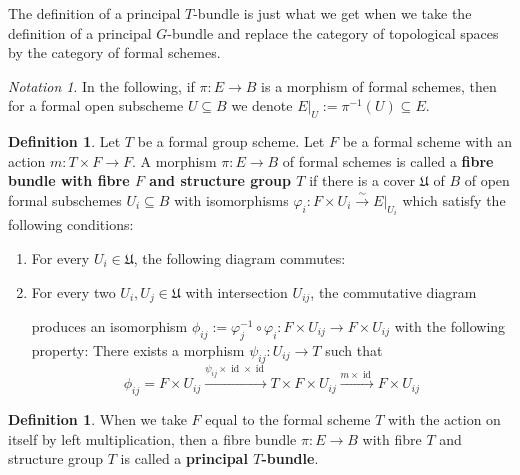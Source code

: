 \documentclass[11pt,oneside]{amsart}
\theoremstyle{definition}
\newtheorem{definition}[theorem]{Definition}
\theoremstyle{remark}
\newtheorem*{notation}{Notation}
\begin{document}
	
	The definition of a principal $T$-bundle is just what we get when we take the definition of a principal $G$-bundle and replace the category of topological spaces by the category of formal schemes.
	\begin{notation}
		In the following, if $\pi:E\rightarrow B$ is a morphism of formal schemes, then for a formal open subscheme $U\subseteq B$ we denote $E|_U:=\pi^{-1}(U)\subseteq E$.
	\end{notation}
	\begin{definition}\label{definition principal T-bundle}
		Let $T$ be a formal group scheme. Let $F$ be a formal scheme with an action $m:T\times F\rightarrow F$.
		A morphism $\pi:E\rightarrow B$ of formal schemes is called a \textbf{fibre bundle with fibre $F$ and structure group $T$} if there is a cover $\mathfrak U$ of $B$ of open formal subschemes $U_i\subseteq B$ with isomorphisms $\varphi_i:F\times U_i \xrightarrow{\sim} E|_{U_i}$ which satisfy the following conditions:
		\begin{enumerate}[label=(\alph*)]
			\item For every $U_i\in \mathfrak U$, the following diagram commutes:
			\begin{center}
			\end{center}
			\item For every two $U_i,U_j\in \mathfrak U$ with intersection $U_{ij}$, the commutative diagram
			\begin{center}
			\end{center}
			produces an isomorphism $\phi_{ij}:=\varphi_j^{-1}\circ\varphi_i: F\times U_{ij}\rightarrow F\times U_{ij}$ with the following property: There exists a morphism $\psi_{ij}:U_{ij}\rightarrow T$ such that
			\[\phi_{ij}=F\times U_{ij} \xrightarrow{\psi_{ij}\times \operatorname{id}\times\operatorname{id}} T\times F\times U_{ij}\xrightarrow{m\times \operatorname{id}} F\times U_{ij}\]
		\end{enumerate}
	\end{definition}
	\begin{definition}
		When we take $F$ equal to the formal scheme $T$ with the action on itself by left multiplication, then a fibre bundle $\pi:E\rightarrow B$ with fibre $T$ and structure group $T$ is called a \textbf{principal $T$-bundle}.
	\end{definition}
	
\end{document}
